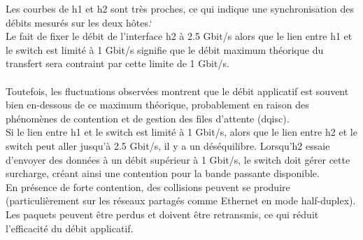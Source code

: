 Les courbes de h1 et h2 sont très proches, ce qui indique une synchronisation des débits mesurés sur les deux hôtes.`\\
Le fait de fixer le débit de l'interface h2 à 2.5 Gbit/s alors que le lien entre h1 et le switch est limité à 1 Gbit/s signifie que le débit maximum théorique du transfert sera contraint par cette limite de 1 Gbit/s.
\\
\\Toutefois, les fluctuations observées montrent que le débit applicatif est souvent bien en-dessous de ce maximum théorique, probablement en raison des phénomènes de contention et de gestion des files d'attente (dqisc).
\vspace{0.5cm}
\\
Si le lien entre h1 et le switch est limité à 1 Gbit/s, alors que le lien entre h2 et le switch peut aller jusqu'à 2.5 Gbit/s, il y a un déséquilibre.
Lorsqu'h2 essaie d'envoyer des données à un débit supérieur à 1 Gbit/s, le switch doit gérer cette surcharge, créant ainsi une contention pour la bande passante disponible.
\\
En présence de forte contention, des collisions peuvent se produire (particulièrement sur les réseaux partagés comme Ethernet en mode half-duplex).
Les paquets peuvent être perdus et doivent être retransmis, ce qui réduit l'efficacité du débit applicatif.




